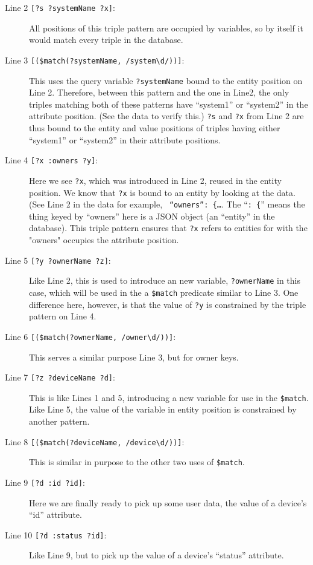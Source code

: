 \documentclass[10pt,letterpaper]{article} %
\newcommand{\stt}[1]{\texttt{#1}} %
\begin{document}
\begin{description}
\item[Line 2 \stt{[?s ?systemName ?x]}:] All positions of this triple pattern are occupied by variables, so by itself it would match every triple in the database.
\item[Line 3 \stt{[(\$match(?systemName, /system\textbackslash d/))]}:] This uses the query variable \stt{?systemName} bound to the entity position on Line 2.
  Therefore, between this pattern and the one in Line2, the only triples matching both of these patterns have ``system1'' or ``system2'' in the attribute position. (See the data to verify this.)
  \stt{?s} and \stt{?x} from Line 2 are thus bound to the entity and value positions of triples having either ``system1'' or ``system2'' in their attribute positions.
\item[Line 4 \stt{[?x :owners ?y]}:] Here we see \stt{?x}, which was introduced in Line 2, reused in the entity position.
  We know that \stt{?x} is bound to an entity by looking at the data.
  (See Line 2 in the data for example, \stt{ ``owners'': \{\ldots}. The ``\stt{: \{}'' means the thing keyed by ``owners'' here is a JSON object (an ``entity'' in the database).
  This triple pattern ensures that \stt{?x} refers to entities for with the "owners" occupies the attribute position.
\item[Line 5 \stt{[?y ?ownerName ?z]}:]  Like Line 2, this is used to introduce an new variable, \stt{?ownerName} in this case, which will be used in the a \stt{\$match} predicate similar to Line 3.
  One difference here, however, is that the value of \stt{?y} is constrained by the triple pattern on Line 4.
\item[Line 6 \stt{[(\$match(?ownerName, /owner\textbackslash d/))]}:] This serves a similar purpose Line 3, but for owner keys.
\item[Line 7 \stt{[?z ?deviceName ?d]}:] This is like Lines 1 and 5, introducing a new variable for use in the \stt{\$match}.
  Like Line 5, the value of the variable in entity position is constrained by another pattern.
\item[Line 8 \stt{[(\$match(?deviceName, /device\textbackslash d/))]}:] This is similar in purpose to the other two uses of \stt{\$match}.
\item[Line 9 \stt{[?d :id ?id]}:] Here we are finally ready to pick up some user data, the value of a device's ``id'' attribute.
\item[Line 10 \stt{[?d :status ?id]}:] Like Line 9, but to pick up the value of a device's ``status'' attribute.
\end{description}
\end{document}
